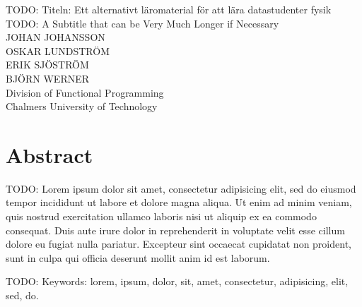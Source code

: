 TODO: Titeln: Ett alternativt läromaterial för att lära datastudenter fysik\\
TODO: A Subtitle that can be Very Much Longer if Necessary\\
JOHAN JOHANSSON \\
OSKAR LUNDSTRÖM \\
ERIK SJÖSTRÖM \\
BJÖRN WERNER \\
Division of Functional Programming\\
Chalmers University of Technology \setlength{\parskip}{0.5cm}

\thispagestyle{plain}			%
\section*{Abstract}
TODO: Lorem ipsum dolor sit amet, consectetur adipisicing elit, sed do eiusmod tempor incididunt ut labore et dolore magna aliqua. Ut enim ad minim veniam, quis nostrud exercitation ullamco laboris nisi ut aliquip ex ea commodo consequat. Duis aute irure dolor in reprehenderit in voluptate velit esse cillum dolore eu fugiat nulla pariatur. Excepteur sint occaecat cupidatat non proident, sunt in culpa qui officia deserunt mollit anim id est laborum.

\vfill
TODO: Keywords: lorem, ipsum, dolor, sit, amet, consectetur, adipisicing, elit, sed, do.

\newpage				%
\thispagestyle{empty}
\mbox{}

